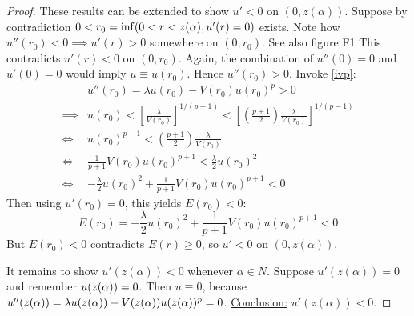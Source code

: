 \begin{lemma}
\begin{proof}
\seperate
These results can be extended to show $u'<0$ on $(0,z(\alpha))$.
Suppose by contradiction $0<r_0=\inf(0<r<z(\alpha),u'(r)=0)$ exists.
Note how $u''(r_0)<0\implies u'(r)>0$ somewhere on $(0,r_0)$.
{\color{red}See also figure F1}
This contradicts $u'(r)<0$ on $(0,r_0)$.
Again, the combination of $u''(0)=0$ and $u'(0)=0$ would imply $u\equiv u(r_0)$.
Hence $u''(r_0)>0$. Invoke \ref{ivp}:
\begin{align*}
  &u''(r_0)=\lambda u(r_0)-V(r_0)u(r_0)^p>0\\
  \implies &u(r_0)<\left[\frac{\lambda}{V(r_0)}\right]^{1/(p-1)}
    <\left[\left(\frac{p+1}{2}\right)\frac{\lambda}{V(r_0)}\right]^{1/(p-1)}\\
  \iff &u(r_0)^{p-1}<\left(\frac{p+1}{2}\right)\frac{\lambda}{V(r_0)}\\
  \iff &\frac{1}{p+1}V(r_0)u(r_0)^{p+1}<\frac{\lambda}{2}u(r_0)^2\\
  \iff &-\frac{\lambda}{2}u(r_0)^2+\frac{1}{p+1}V(r_0)u(r_0)^{p+1}<0
\end{align*}
Then using $u'(r_0)=0$, this yields $E(r_0)<0$:
$$ E(r_0)=-\frac{\lambda}{2}u(r_0)^2+\frac{1}{p+1}V(r_0)u(r_0)^{p+1}<0 $$
But $E(r_0)<0$ contradicts $E(r)\geq0$, so $u'<0$ on $(0,z(\alpha))$.

\seperate

It remains to show $u'(z(\alpha))<0$ whenever $\alpha\in N$.
Suppose $u'(z(\alpha))=0$ and remember $u(z(\alpha))=0$.
Then $u\equiv0$, because $u''(z(\alpha))=\lambda u(z(\alpha))-V(z(\alpha))u(z(\alpha))^p=0$.
\underline{Conclusion:} $u'(z(\alpha))<0$.


\end{proof}
\end{lemma}
